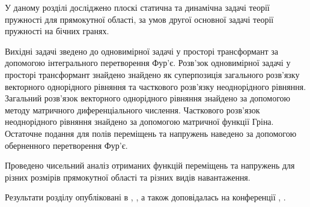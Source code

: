 У даному розділі досліджено плоскі статична та динамічна задачі теорії пружності для прямокутної області,
за умов другої основної задачі теорії пружності на бічних гранях.

Вихідні задачі зведено до одновимірної задачі у просторі трансформант за допомогою інтегрального перетворення Фур'є.
Розв'зок одновимірної задачі у просторі трансформант знайдено знайдено як суперпозиція загального розв'язку векторного однорідного рівняння
та часткового розв'язку неоднорідного рівняння.
Загальний розв'язок векторного однорідного рівняння знайдено за допомогою методу матричного диференціального числення.
Часткового розв'язок неоднорідного рівняння знайдено за допомогою матричної функції Гріна.
Остаточне подання для полів переміщень та напружень наведено за допомогою оберненного перетворення Фур'є.

Проведено чисельний аналіз отриманих функцій переміщень та напружень для різних розмірів прямокутної області та різних видів навантаження.

Результати розділу опубліковані в \cite{pozhylenkov_4}, \cite{pozhylenkov_6}, а також доповідалась на конференції \cite{conf_3}, \cite{conf_5}.